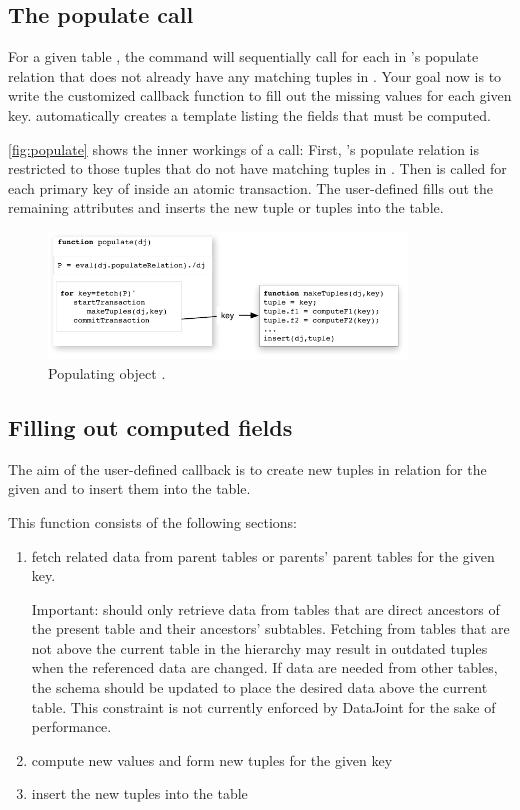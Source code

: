 \documentclass[10pt]{article}
\begin{document}
\subsection{The populate call}
For a given table , the command   will sequentially call  for each  in 's populate relation that does not already have any matching tuples in .  Your goal now is to write the customized  callback function to fill out the missing values for each given key.  automatically creates a template  listing the fields that must be computed. 

\autoref{fig:populate} shows the inner workings of a  call: First, 's populate relation  is restricted to those tuples that do not have matching tuples in .  Then  is called for each primary key of  inside an atomic transaction. The user-defined  fills out the remaining attributes and inserts the new tuple or tuples into the table. 


\begin{figure}[h]
\center \includegraphics[width=0.85\textwidth]{populate.pdf}
\caption{Populating object .   }
\label{fig:populate}
\end{figure}

\subsection{Filling out computed fields}
The aim of the user-defined  callback is to create new tuples in relation  for the given  and to insert them into the table.

This function consists of the following sections:
\begin{enumerate}
\item fetch related data from parent tables or parents' parent tables for the given key.  

{\color{red}Important:}  should only retrieve data from tables that are direct ancestors of the present table and their ancestors' subtables. Fetching from tables that are not above the current table in the hierarchy may result in outdated tuples when the referenced data are changed. If data are needed from other tables, the schema should be updated to place the desired data above the current table.  This constraint is not currently enforced by DataJoint for the sake of performance. 
\item compute new values and form new tuples for the given key
\item insert the new tuples into the table
\end{enumerate}
\end{document}
